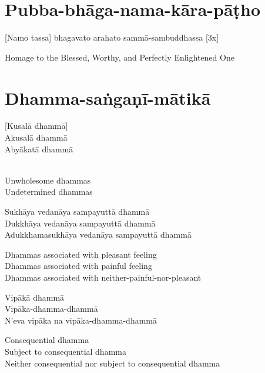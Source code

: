 \section{Pubba-bhāga-nama-kāra-pāṭho}
\label{pubba-bhaga-nama-kara-patho}

\vspace{-0.85em}

[Namo tassa] bhagavato arahato sammā-sambuddhassa \hfill{[3x]}

\begin{english}
  Homage to the Blessed, Worthy, and Perfectly Enlightened One
\end{english}

\vspace{1em}

\section{Dhamma-saṅgaṇī-mātikā}
\label{dhamma-sangani-matika}

\vspace{-0.8em}

[Kusalā dhammā]\\
Akusalā dhammā\\
Abyākatā dhammā

\begin{english-verses}
  \\
  Unwholesome dhammas\\
  Undetermined dhammas
\end{english-verses}

Sukhāya vedanāya sampayuttā dhammā\\
Dukkhāya vedanāya sampayuttā dhammā\\
Adukkhamasukhāya vedanāya sampayuttā dhammā

\begin{english-verses}
  Dhammas associated with pleasant feeling\\
  Dhammas associated with painful feeling\\
  Dhammas associated with neither-painful-nor-pleasant
\end{english-verses}

Vipākā dhammā\\
Vipāka-dhamma-dhammā\\
N'eva vipāka na vipāka-dhamma-dhammā

\begin{english-verses}
  Consequential dhamma\\
  Subject to consequential dhamma\\
  Neither consequential nor subject to consequential dhamma
\end{english-verses}

